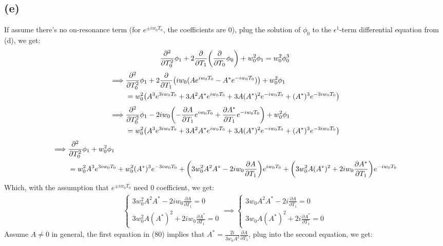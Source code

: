\documentclass{article}
\DeclarePairedDelimiter{\paran}{(}{)}%
\begin{document}
\subsection*{(e)}
If assume there's no on-resonance term (for $e^{\pm iw_0T_0}$, the coefficients are $0$), plug the solution of $\phi_0$ to the $\epsilon^1$-term differential equation from (d), we get:
\begin{align}
    \frac{\partial^2}{\partial T_0^2}\phi_1 + 2\frac{\partial}{\partial T_1}\paran*{\frac{\partial}{\partial T_0}\phi_0} + w_0^2\phi_1 = w_0^2\phi_0^3
\end{align}
\begin{align}
    \implies&\frac{\partial^2}{\partial T_0^2}\phi_1 + 2\frac{\partial}{\partial T_1}\paran*{iw_0(Ae^{iw_0T_0}-A^*e^{-iw_0T_0})} + w_0^2\phi_1 \\
    &= w_0^2\paran*{A^3e^{3iw_0T_0} + 3A^2A^*e^{iw_0T_0}+3A(A^*)^2e^{-iw_0T_0}+(A^*)^3e^{-3iw_0T_0}}
\end{align}
\begin{align}
    \implies&\frac{\partial^2}{\partial T_0^2}\phi_1 - 2iw_0\paran*{-\frac{\partial A}{\partial T_1}e^{iw_0T_0}+\frac{\partial A^*}{\partial T_1}e^{-iw_0T_0}} + w_0^2\phi_1\\
    &= w_0^2\paran*{A^3e^{3iw_0T_0} + 3A^2A^*e^{iw_0T_0}+3A(A^*)^2e^{-iw_0T_0}+(A^*)^3e^{-3iw_0T_0}}
\end{align}
\begin{align}
    \implies &\frac{\partial^2}{\partial T_0^2}\phi_1+w_0^2\phi_1 \\
    &= w_0^2A^3e^{3iw_0T_0}+w_0^2(A^*)^3e^{-3iw_0T_0} + \paran*{3w_0^2A^2A^* - 2iw_0\frac{\partial A}{\partial T_1}}e^{iw_0T_0} + \paran*{3w_0^2A(A^*)^2+2iw_0\frac{\partial A^*}{\partial T_1}}e^{-iw_0T_0}
\end{align}
Which, with the assumption that $e^{\pm iw_0T_0}$ need $0$ coefficient, we get:
\begin{align}
    \begin{cases}
        3w_0^2A^2A^*-2iw_0\frac{\partial A}{\partial T_1}=0\\
        3w_0^2A(A^*)^2+2iw_0\frac{\partial A^*}{\partial T_1}=0
    \end{cases}\implies \begin{cases}
        3w_0A^2A^*-2i\frac{\partial A}{\partial T_1}=0\\
        3w_0A(A^*)^2+2i\frac{\partial A^*}{\partial T_1}=0
    \end{cases}
\end{align}
Assume $A\neq 0$ in general, the first equation in (80) implies that $A^* = \frac{2i}{3w_0A^2}\frac{\partial A}{\partial T_1}$, plug into the second equation, we get:
\end{document}
